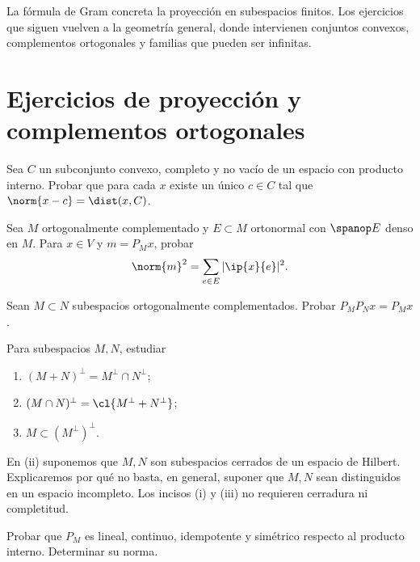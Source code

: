 La fórmula de Gram concreta la proyección en subespacios finitos. Los ejercicios que siguen vuelven a la geometría general, donde intervienen conjuntos convexos, complementos ortogonales y familias que pueden ser infinitas.

\section{Ejercicios de proyección y complementos ortogonales}

\begin{ejercicio}\label{ej:lectura-30-1}
Sea $C$ un subconjunto convexo, completo y no vacío de un espacio con producto interno. Probar que para cada $x$ existe un único $c\in C$ tal que $\norm{x-c}=\dist(x,C)$.
\end{ejercicio}


\begin{ejercicio}\label{ej:lectura-30-2}
Sea $M$ ortogonalmente complementado y $E\subset M$ ortonormal con $\spanop E$ denso en $M$. Para $x\in V$ y $m=P_Mx$, probar
\[
 \norm{m}^{2}=\sum_{e\in E}|\ip{x}{e}|^{2}.
\]
\end{ejercicio}


\begin{ejercicio}\label{ej:lectura-30-3}
Sean $M\subset N$ subespacios ortogonalmente complementados. Probar $P_MP_Nx=P_Mx$.
\end{ejercicio}


\begin{ejercicio}\label{ej:lectura-30-4}
Para subespacios $M,N$, estudiar
\begin{enumerate}[label=(\roman*)]
 \item $(M+N)^{\perp}=M^{\perp}\cap N^{\perp}$;
 \item $(M\cap N)^{\perp}=\cl{M^{\perp}+N^{\perp}}$;
 \item $M\subset(M^{\perp})^{\perp}$.
\end{enumerate}
En (ii) suponemos que $M,N$ son subespacios cerrados de un espacio de Hilbert. Explicaremos por qué no basta, en general, suponer que $M,N$ sean distinguidos en un espacio incompleto. Los incisos (i) y (iii) no requieren cerradura ni completitud.
\end{ejercicio}


\begin{ejercicio}\label{ej:lectura-30-5}
Probar que $P_M$ es lineal, continuo, idempotente y simétrico respecto al producto interno. Determinar su norma.
\end{ejercicio}


